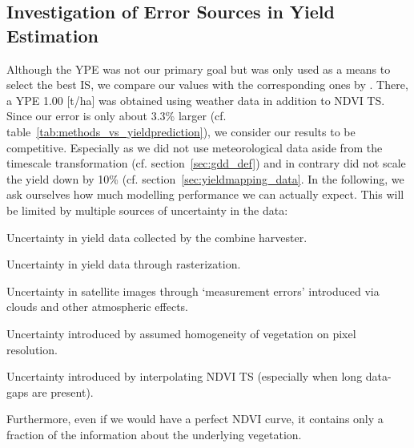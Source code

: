 {    \subsection{Investigation of Error Sources in Yield Estimation}{\label{sec:discuss_high-rmse-in-yield-prdiction}
        Although the YPE was not our primary goal but was only used as a means to select the best IS, we compare our values with the corresponding ones by \cite{perichPixelbasedCropYield2022}. There, a YPE 1.00 [t/ha] was obtained using weather data in addition to NDVI TS. Since our error is only about 3.3\% larger (cf. table~\ref{tab:methods_vs_yieldprediction}), we consider our results to be competitive. Especially as we did not use meteorological data aside from the timescale transformation (cf. section~\ref{sec:gdd_def}) and in contrary did not scale the yield down by 10\% (cf. section~\ref{sec:yieldmapping_data}. In the following, we ask ourselves how much modelling performance we can actually expect. This will be limited by multiple sources of uncertainty in the data:
        \begin{Nenumerate}
            \item Uncertainty in yield data collected by the combine harvester.
            \item Uncertainty in yield data through rasterization.
            \item Uncertainty in satellite images through `measurement errors' introduced via clouds and other atmospheric effects.
            \item Uncertainty introduced by assumed homogeneity of vegetation on pixel resolution. 
            \item Uncertainty introduced by interpolating NDVI TS (especially when long data-gaps are present).
        \end{Nenumerate}
        Furthermore, even if we would have a perfect NDVI curve, it contains only a fraction of the information about the underlying vegetation. 
}}
